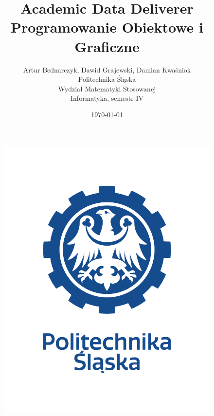 \documentclass[12pt,a4paper]{article}
\title{Academic Data Deliverer\\Programowanie Obiektowe i Graficzne}
\author{Artur Bednarczyk, Dawid Grajewski, Damian Kwaśniok\\Politechnika Śląska\\Wydział Matematyki Stosowanej\\Informatyka, semestr IV}
\date{\today}
\begin{document}
	\maketitle
	\begin{figure}[H]
		\centering
		\includegraphics[width=0.5\linewidth]{LOGO2}
		\label{fig:logo}
	\end{figure}
	\clearpage
	\tableofcontents
	\clearpage
\end{document}
